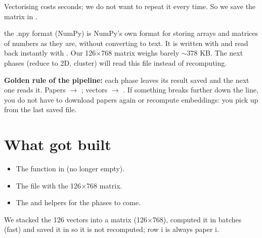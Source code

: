\documentclass[11pt,a4paper]{article}
\begin{document}
Vectorising costs seconds; we do not want to repeat it every time. So we save the matrix in
.

\begin{concepto}{the .npy format (NumPy)}
 is NumPy's own format for storing arrays and matrices of numbers as they are,
without converting to text. It is written with  and read back instantly
with . Our 126$\times$768 matrix weighs barely $\sim$378 KB. The next
phases (reduce to 2D, cluster) will read this file instead of recomputing.
\end{concepto}

\begin{ojo}
\textbf{Golden rule of the pipeline:} each phase leaves its result saved and the next one
reads it. Papers $\rightarrow$ ; vectors $\rightarrow$
. If something breaks further down the line, you do not have to download
papers again or recompute embeddings: you pick up from the last saved file.
\end{ojo}

\section{What got built}

\begin{itemize}
  \item The  function in  (no longer empty).
  \item The file  with the 126$\times$768 matrix.
  \item The  and  helpers for the
        phases to come.
\end{itemize}

\begin{resumen}
We stacked the 126 vectors into a matrix (126$\times$768), computed it in batches (fast) and
saved it in  so it is not recomputed; row i is always paper i.
\end{resumen}
\end{document}
